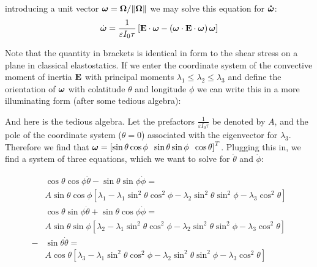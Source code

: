 \documentclass[extra,onecolumn]{gji}
\newif\ifdetail
\begin{document}
introducing a unit vector $\mitbf{\omega} = {\bf \Omega}/\|{\bf \Omega} \|$ we may solve this equation for ${\bf \dot{\mitbf{\omega}} }$:
\begin{equation}
 \dot{\mitbf{\omega}}  = \frac{1}{\varepsilon I_0 \tau} \left[ {\bf E \cdot \mitbf{\omega}} - \left( {\bf \mitbf{\omega} \cdot E \cdot \mitbf{\omega} } \right) \mitbf{\omega} \right]
\end{equation}

Note that the quantity in brackets is identical in form to the shear stress on a plane in classical elastostatics.
If we enter the coordinate system of the convective moment of inertia $\bf E$ with principal moments $\lambda_1 \le \lambda_2 \le \lambda_3$ and define the orientation of $\mitbf{\omega}$ with colatitude $\theta$ and longitude $\phi$ we can write this in a more illuminating form (after some tedious algebra):

\ifdetail

And here is the tedious algebra.  Let the prefactors $\frac{1}{\varepsilon I_0 \tau}$ be denoted by $A$, and the pole of the coordinate system ($\theta = 0$) associated with the eigenvector for $\lambda_3$.  Therefore we find that $\mitbf{\omega} = \left[ \sin{\theta} \cos{\phi} \;\; \sin{\theta} \sin{\phi} \;\; \cos{\theta} \right]^T$.  Plugging this in, we find a system of three equations, which we want to solve for $\dot{\theta}$ and $\dot{\phi}$:

\begin{equation}
\begin{aligned}
 & \cos{\theta}\cos{\phi} \dot{\theta}  - \sin{\theta}\sin{\phi} \dot{\phi} = \\
  &A \sin{\theta}\cos{\phi}\left[ \lambda_1 - \lambda_1 \sin^2{\theta}\cos^2{\phi} - \lambda_2 \sin^2{\theta}\sin^2{\phi} - \lambda_3 \cos^2{\theta} \right] \\
 &\cos{\theta}\sin{\phi} \dot{\theta}  + \sin{\theta}\cos{\phi} \dot{\phi} = \\
  &A \sin{\theta}\sin{\phi} \left[ \lambda_2 - \lambda_1 \sin^2{\theta}\cos^2{\phi} - \lambda_2 \sin^2{\theta}\sin^2{\phi} - \lambda_3 \cos^2{\theta} \right] \\
 - &\sin{\theta} \dot{\theta} = \\
  &A \cos{\theta} \left[ \lambda_3 - \lambda_1 \sin^2{\theta}\cos^2{\phi} - \lambda_2 \sin^2{\theta}\sin^2{\phi} - \lambda_3 \cos^2{\theta} \right] \\
\end{aligned}
\end{equation}
\end{document}
